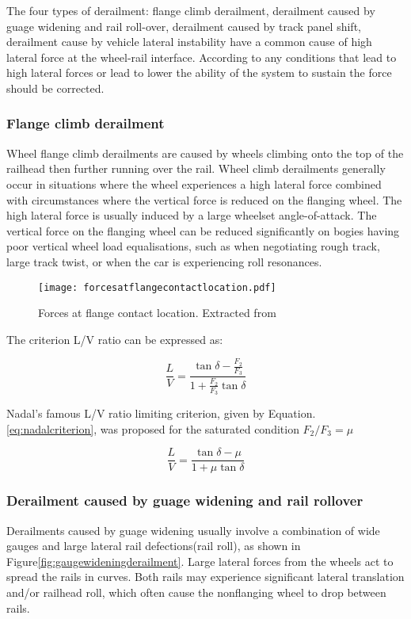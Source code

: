 The four types of derailment: flange climb derailment, derailment caused by guage widening and rail roll-over, derailment caused by track panel shift, derailment cause by vehicle lateral instability have a common cause of high lateral force at the wheel-rail interface. According to \cite[Chapter 8, IV]{iwnicki2006handbook} any conditions that lead to high lateral forces or lead to lower the ability of the system to sustain the force should be corrected. 

\subsubsection{Flange climb derailment}
Wheel flange climb derailments are caused by wheels climbing onto the top of the railhead then further running over the rail. Wheel climb derailments generally occur in situations where the wheel experiences a high lateral force combined with circumstances where the vertical force is reduced on the flanging wheel. The high lateral force is usually induced by a large wheelset angle-of-attack. The vertical force on the flanging wheel can be reduced significantly on bogies having poor vertical wheel load equalisations, such as when negotiating rough track, large track twist, or when the car is experiencing roll resonances. 

\begin{figure}[h]
    \centering
    \texttt{[image: forcesatflangecontactlocation.pdf]}
    \caption{Forces at flange contact location. Extracted from \cite[Figure8.4]{iwnicki2006handbook}}
    \label{fig:forcesatflangecontactlocation}
\end{figure}

The criterion L/V ratio can be expressed as:

\begin{equation}
    \frac{L}{V}=\frac{\tan \delta -\frac{F_2}{F_3}}{1+\frac{F_2}{F_3}\tan \delta}
\end{equation}

Nadal's famous L/V ratio limiting criterion, given by Equation.\ref{eq:nadalcriterion}, was proposed for the saturated condition $F_2/F_3=\mu$

\begin{equation}\label{eq:nadalcriterion}
    \frac{L}{V}=\frac{\tan \delta - \mu}{1+ \mu \tan \delta}
\end{equation}

\subsubsection{Derailment caused by guage widening and rail rollover}
Derailments caused by guage widening usually involve a combination of wide gauges and large lateral rail defections(rail roll), as shown in Figure\ref{fig:gaugewideningderailment}. Large lateral forces from the wheels act to spread the rails in curves. Both rails may experience significant lateral translation and/or railhead roll, which often cause the nonflanging wheel to drop between rails.

